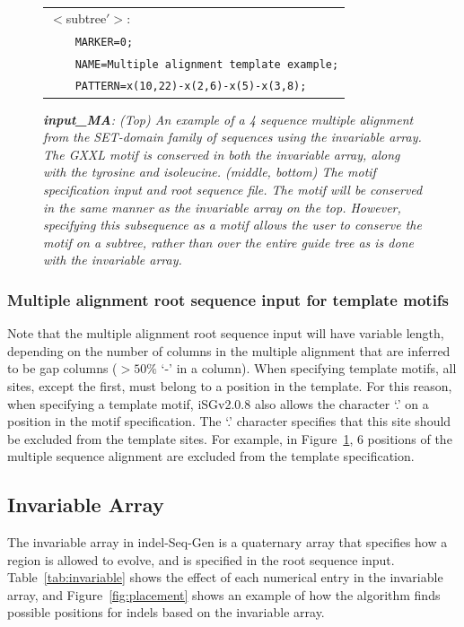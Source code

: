 \documentclass[10pt]{article}
\newcommand{\version}{2.0.8 }
\newcommand{\iSGcurrentshort}{iSGv\version }
\begin{document}
\begin{figure}[Htbp]
\begin{tabular}{|l|}
$<$subtree$'>$:\\
\verb+    MARKER=0;+\\
\verb+    NAME=Multiple alignment template example;+\\
\verb+    PATTERN=x(10,22)-x(2,6)-x(5)-x(3,8);+\\
\hline
\end{tabular}
\caption{\textit{{\bf input\_MA}: (Top) An example of a 4 sequence multiple alignment from the SET-domain family of sequences using the invariable array.  The GXXL motif is conserved in both the invariable array, along with the tyrosine and isoleucine. (middle, bottom) The motif specification input and root sequence file. The motif will be conserved in the same manner as the invariable array on the top. However, specifying this subsequence as a motif allows the user to conserve the motif on a subtree, rather than over the entire guide tree as is done with the invariable array.}}
\label{fig:input_MA}
\end{figure}

 \subsubsection{Multiple alignment root sequence input for template motifs}
 
 Note that the multiple alignment root sequence input will have variable length, depending on the number of columns in the multiple alignment that are inferred to be gap columns ($>50\%$ `-' in a column). When specifying template motifs, all sites, except the first, must belong to a position in the template. For this reason, when specifying a template motif, \iSGcurrentshort also allows the character `.' on a position in the motif specification. The `.' character specifies that this site should be excluded from the template sites. For example, in Figure~\ref{fig:input_MA}, 6 positions of the multiple sequence alignment are excluded from the template specification.

\subsection{Invariable Array}

The invariable array in indel-Seq-Gen is a quaternary array that specifies how a region is 
allowed to evolve, and is specified in the root sequence input. Table~\ref{tab:invariable} 
shows the effect of each numerical entry in the invariable array, and Figure~\ref{fig:placement} shows an example of how the algorithm finds possible positions for indels based on the invariable array.
\end{document}
